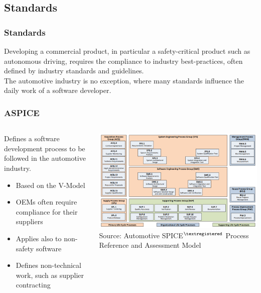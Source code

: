 \subsection{Standards}

\begin{frame}
\frametitle{Standards}
Developing a commercial product, in particular a safety-critical product such
as autonomous driving, requires the compliance to industry best-practices,
often defined by industry standards and guidelines.\\

The automotive industry is no exception, where many standards influence the
daily work of a software developer.
\end{frame}

\begin{frame}
\frametitle{ASPICE}
\begin{columns}[T]
    \begin{column}{0.4\textwidth}
        Defines a software development process to be followed in the automotive
        industry.\\
        \begin{itemize}
            \item Based on the V-Model
            \item OEMs often require compliance for their suppliers
            \item Applies also to non-safety software
            \item Defines non-technical work, such as supplier contracting
        \end{itemize}
    \end{column}
    \begin{column}{0.6\textwidth}
        \centering
        \includegraphics[width=\textwidth]{images/aspice.png}\\
        \footnotesize Source: Automotive SPICE$^{\tiny{\textregistered}}$
            Process Reference and Assessment Model\footnotemark[1]
    \end{column}
\end{columns}
\end{frame}

